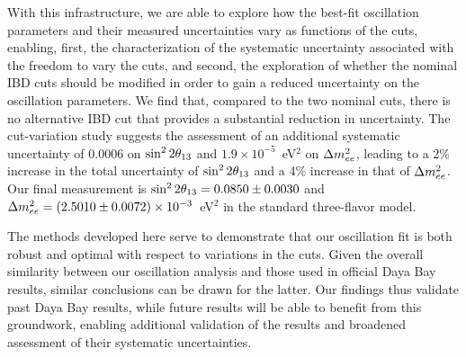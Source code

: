 With this infrastructure, we are able to explore how the best-fit oscillation parameters and their measured uncertainties vary as functions of the cuts, enabling, first, the characterization of the systematic uncertainty associated with the freedom to vary the cuts, and second, the exploration of whether the nominal IBD cuts should be modified in order to gain a reduced uncertainty on the oscillation parameters. We find that, compared to the two nominal cuts, there is no alternative IBD cut that provides a substantial reduction in uncertainty. The cut-variation study suggests the assessment of an additional systematic uncertainty of 0.0006 on $\sin^2 2\theta_{13}$ and $1.9\times10^{-5}$~eV$^2$ on $\Delta m^2_{ee}$, leading to a 2\% increase in the total uncertainty of $\sin^2 2\theta_{13}$ and a 4\% increase in that of $\Delta m^2_{ee}$. Our final measurement is $\sin^2 2\theta_{13} = 0.0850 \pm 0.0030$ and $\Delta m^2_{ee} = (2.5010 \pm 0.0072) \times 10^{-3}$~eV$^2$ in the standard three-flavor model.

The methods developed here serve to demonstrate that our oscillation fit is both robust and optimal with respect to variations in the cuts. Given the overall similarity between our oscillation analysis and those used in official Daya Bay results, similar conclusions can be drawn for the latter. Our findings thus validate past Daya Bay results, while future results will be able to benefit from this groundwork, enabling additional validation of the results and broadened assessment of their systematic uncertainties.

%


\clearpage
